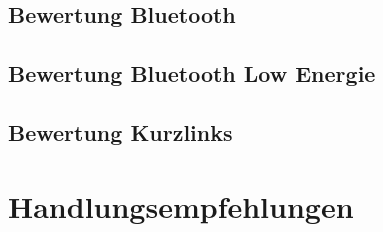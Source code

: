 
\subsection{Bewertung Bluetooth} %
\label{sub:bewertung_bluetooth}


\subsection{Bewertung Bluetooth Low Energie} %
\label{sub:bewertung_bluetooth_low_energie}


\subsection{Bewertung Kurzlinks} %
\label{sub:bewertung_kurzlinks}



\newpage
\section{Handlungsempfehlungen} %
\label{sec:handlungsempfehlungen}

